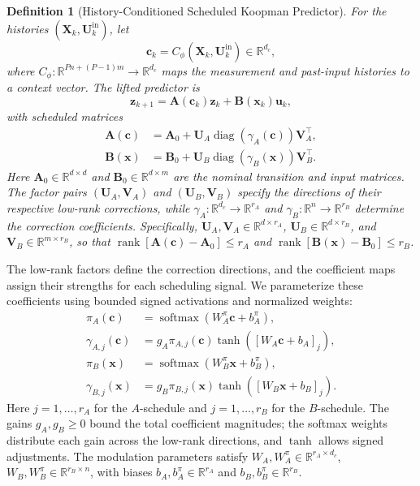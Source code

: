 \documentclass[journal]{IEEEtran}
\newtheorem{definition}{Definition}
\newcommand{\vx}{\mathbf{x}}
\newcommand{\vu}{\mathbf{u}}
\newcommand{\vz}{\mathbf{z}}
\newcommand{\vc}{\mathbf{c}}
\newcommand{\mA}{\mathbf{A}}
\newcommand{\mB}{\mathbf{B}}
\newcommand{\mU}{\mathbf{U}}
\newcommand{\mV}{\mathbf{V}}
\newcommand{\mX}{\mathbf{X}}
\newcommand{\R}{\mathbb{R}}
\begin{document}
\begin{definition}[History-Conditioned Scheduled Koopman Predictor]
\label{def:scheduled_lowrank_predictor}
For the histories $(\mX_k,\mU_k^{\mathrm{in}})$, let
\begin{equation}
    \vc_k=C_\phi(\mX_k,\mU_k^{\mathrm{in}})\in\R^{d_c},
    \label{eq:history_context}
\end{equation}
where $C_\phi:\R^{Pn+(P-1)m}\to\R^{d_c}$ maps the measurement and past-input histories to a context vector. The lifted predictor is
\begin{equation}
    \vz_{k+1}=\mA(\vc_k)\vz_k+\mB(\vx_k)\vu_k,
    \label{eq:scheduled_predictor}
\end{equation}
with scheduled matrices
\begin{align}
    \mA(\vc)&=\mA_0+\mU_A\operatorname{diag}(\gamma_A(\vc))\mV_A^\top,
    \label{eq:transition_schedule}\\
    \mB(\vx)&=\mB_0+\mU_B\operatorname{diag}(\gamma_B(\vx))\mV_B^\top.
    \label{eq:low_rank_schedules}
\end{align}
Here $\mA_0\in\R^{d\times d}$ and $\mB_0\in\R^{d\times m}$ are the nominal transition and input matrices. The factor pairs $(\mU_A,\mV_A)$ and $(\mU_B,\mV_B)$ specify the directions of their respective low-rank corrections, while $\gamma_A:\R^{d_c}\to\R^{r_A}$ and $\gamma_B:\R^n\to\R^{r_B}$ determine the correction coefficients. Specifically, $\mU_A,\mV_A\in\R^{d\times r_A}$, $\mU_B\in\R^{d\times r_B}$, and $\mV_B\in\R^{m\times r_B}$, so that $\operatorname{rank}[\mA(\vc)-\mA_0]\le r_A$ and $\operatorname{rank}[\mB(\vx)-\mB_0]\le r_B$.
\end{definition}

The low-rank factors define the correction directions, and the coefficient maps assign their strengths for each scheduling signal. We parameterize these coefficients using bounded signed activations and normalized weights:
\begin{align}
    \pi_A(\vc)&=\operatorname{softmax}(W_A^\pi\vc+b_A^\pi),
    \label{eq:A_modulation}\\
    \gamma_{A,j}(\vc)&=g_A\pi_{A,j}(\vc)\tanh([W_A\vc+b_A]_j),
    \label{eq:A_modulation_coefficients}\\
    \pi_B(\vx)&=\operatorname{softmax}(W_B^\pi\vx+b_B^\pi),\\
    \gamma_{B,j}(\vx)&=g_B\pi_{B,j}(\vx)\tanh([W_B\vx+b_B]_j).
\end{align}
Here $j=1,\ldots,r_A$ for the $A$-schedule and $j=1,\ldots,r_B$ for the $B$-schedule. The gains $g_A,g_B\ge0$ bound the total coefficient magnitudes; the softmax weights distribute each gain across the low-rank directions, and $\tanh$ allows signed adjustments. The modulation parameters satisfy $W_A,W_A^\pi\in\R^{r_A\times d_c}$, $W_B,W_B^\pi\in\R^{r_B\times n}$, with biases $b_A,b_A^\pi\in\R^{r_A}$ and $b_B,b_B^\pi\in\R^{r_B}$.
\end{document}
